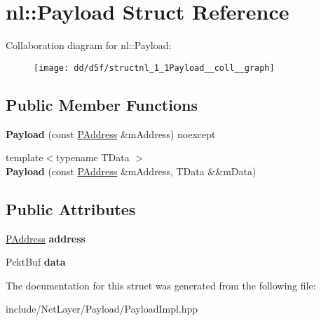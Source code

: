 \hypertarget{structnl_1_1Payload}{}\section{nl\+:\+:Payload Struct Reference}
\label{structnl_1_1Payload}


Collaboration diagram for nl\+:\+:Payload\+:\nopagebreak
\begin{figure}[H]
\begin{center}
\leavevmode
\texttt{[image: dd/d5f/structnl\_1\_1Payload\_\_coll\_\_graph]}
\end{center}
\end{figure}
\subsection*{Public Member Functions}
\begin{DoxyCompactItemize}
\item 
\hypertarget{structnl_1_1Payload_a69fdb72c6756252c3d3dae312caf97ae}{}{\bfseries Payload} (const \hyperlink{structnl_1_1PAddress}{P\+Address} \&m\+Address) noexcept\label{structnl_1_1Payload_a69fdb72c6756252c3d3dae312caf97ae}

\item 
\hypertarget{structnl_1_1Payload_a83d1e4e02369b17f3f1ddfa85c1f4823}{}{\footnotesize template$<$typename T\+Data $>$ }\\{\bfseries Payload} (const \hyperlink{structnl_1_1PAddress}{P\+Address} \&m\+Address, T\+Data \&\&m\+Data)\label{structnl_1_1Payload_a83d1e4e02369b17f3f1ddfa85c1f4823}

\end{DoxyCompactItemize}
\subsection*{Public Attributes}
\begin{DoxyCompactItemize}
\item 
\hypertarget{structnl_1_1Payload_a5cd9e5b5e6271123bf564ac5fb8e4971}{}\hyperlink{structnl_1_1PAddress}{P\+Address} {\bfseries address}\label{structnl_1_1Payload_a5cd9e5b5e6271123bf564ac5fb8e4971}

\item 
\hypertarget{structnl_1_1Payload_aa5d03839f17a000d8a333352a29180be}{}Pckt\+Buf {\bfseries data}\label{structnl_1_1Payload_aa5d03839f17a000d8a333352a29180be}

\end{DoxyCompactItemize}


The documentation for this struct was generated from the following file\+:\begin{DoxyCompactItemize}
\item 
include/\+Net\+Layer/\+Payload/Payload\+Impl.\+hpp\end{DoxyCompactItemize}
